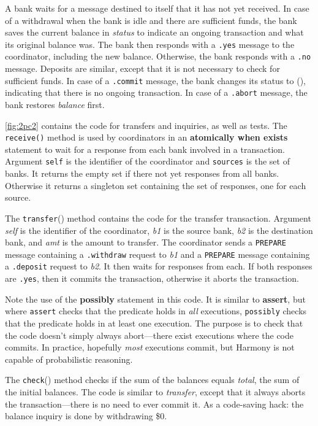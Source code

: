 \documentclass{report}
\begin{document}
\noindent
A bank waits for a message destined to itself that it has not yet received.
In case of a withdrawal when the bank is idle and there are sufficient
funds, the bank saves the current balance in \textit{status} to indicate
an ongoing transaction and what its original balance was.
The bank then responds with a \texttt{.yes} message to the coordinator,
including the new balance.
Otherwise, the bank responds with a \texttt{.no} message.
Deposits are similar, except that it is not necessary to check for
sufficient funds.
In case of a \texttt{.commit} message, the bank changes its status
to (), indicating that there is no ongoing transaction.  In case of
a \texttt{.abort} message, the bank restores \textit{balance} first.

\autoref{fig:2pc2} contains the code for transfers and inquiries, as well
as tests.
The \texttt{receive()} method is used by coordinators in an
\textbf{atomically when exists}
statement to wait for a response from each bank involved in a transaction.
Argument \texttt{self} is the
identifier of the coordinator and \texttt{sources} is the set of banks.
It returns the empty set if there not yet responses from all banks.
Otherwise it returns a singleton set containing the set of responses,
one for each source.

The \texttt{transfer}() method contains the code for the transfer
transaction.  Argument \textit{self} is the identifier of the coordinator,
\textit{b1} is the source bank, \textit{b2} is the destination bank,
and \textit{amt} is the amount to transfer.
The coordinator sends a \texttt{PREPARE} message containing a
\texttt{.withdraw} request to \textit{b1} and a \texttt{PREPARE}
message containing a \texttt{.deposit} request to \textit{b2}.
It then waits for responses from each.  If both responses are
\texttt{.yes}, then it commits the transaction, otherwise it aborts
the transaction.

Note the use of the \textbf{possibly} statement in this code.
It is similar to \textbf{assert}, but where \texttt{assert} checks that
the predicate holds in \emph{all} executions, \texttt{possibly} checks
that the predicate holds in at least one execution.
The purpose is to check that the code doesn't simply always abort---there
exist executions where the code commits.
In practice, hopefully \emph{most} executions commit, but Harmony is not
capable of probabilistic reasoning.

The \texttt{check}() method checks if the sum of the balances equals
\textit{total}, the sum of the initial balances.
The code is similar to \textit{transfer}, except that it always
aborts the transaction---there is no need to ever commit it.
As a code-saving hack: the balance inquiry is done by withdrawing \$0.
\end{document}
